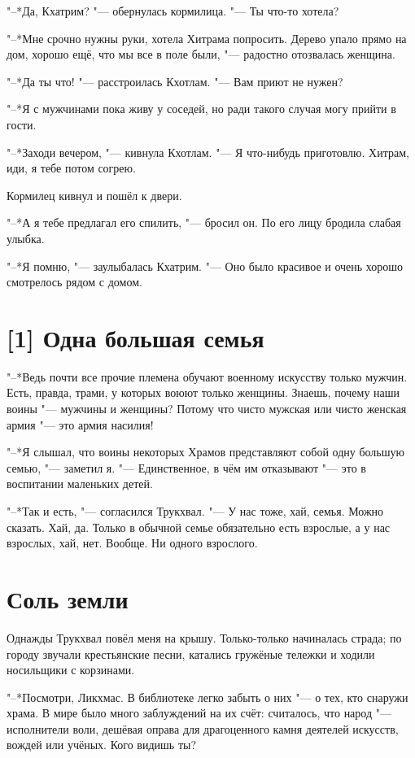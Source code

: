 "--*Да, Кхатрим? "--- обернулась кормилица.
"--- Ты что-то хотела?

"--*Мне срочно нужны руки, хотела Хитрама попросить.
Дерево упало прямо на дом, хорошо ещё, что мы все в поле были, "--- радостно отозвалась женщина.

"--*Да ты что! "--- расстроилась Кхотлам.
"--- Вам приют не нужен?

"--*Я с мужчинами пока живу у соседей, но ради такого случая могу прийти в гости.

"--*Заходи вечером, "--- кивнула Кхотлам.
"--- Я что-нибудь приготовлю.
Хитрам, иди, я тебе потом согрею.

Кормилец кивнул и пошёл к двери.

"--*А я тебе предлагал его спилить, "--- бросил он.
По его лицу бродила слабая улыбка.

"--*Я помню, "--- заулыбалась Кхатрим.
"--- Оно было красивое и очень хорошо смотрелось рядом с домом.

\section{[1] Одна большая семья}

"--*Ведь почти все прочие племена обучают военному искусству только мужчин.
Есть, правда, трами, у которых воюют только женщины.
Знаешь, почему наши воины "--- мужчины и женщины?
Потому что чисто мужская или чисто женская армия "--- это армия насилия!

"--*Я слышал, что воины некоторых Храмов представляют собой одну большую семью, "--- заметил я.
"--- Единственное, в чём им отказывают "--- это в воспитании маленьких детей.

"--*Так и есть, "--- согласился Трукхвал.
"--- У нас тоже, хай, семья.
Можно сказать.
Хай, да.
Только в обычной семье обязательно есть взрослые, а у нас взрослых, хай, нет.
Вообще.
Ни одного взрослого.

\section{Соль земли}

Однажды Трукхвал повёл меня на крышу.
Только-только начиналась страда;
по городу звучали крестьянские песни, катались гружёные тележки и ходили носильщики с корзинами.

"--*Посмотри, Ликхмас.
В библиотеке легко забыть о них "--- о тех, кто снаружи храма.
В мире было много заблуждений на их счёт: считалось, что народ "--- исполнители воли, дешёвая оправа для драгоценного камня деятелей искусств, вождей или учёных.
Кого видишь ты?

